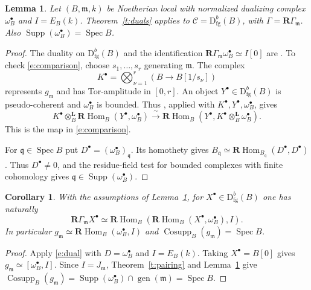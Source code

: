 \documentclass[11pt,reqno]{amsart}
\newtheorem{corollary}[theorem]{Corollary}
\newtheorem{lemma}[theorem]{Lemma}
\theoremstyle{definition}
\DeclareMathOperator{\Cosupp}{Cosupp}
\DeclareMathOperator{\Supp}{Supp}
\DeclareMathOperator{\gen}{gen}
\DeclareMathOperator{\Spec}{Spec}
\newcommand{\D}{\mathrm D}
\newcommand{\q}{\mathfrak q}
\newcommand{\m}{\mathfrak m}
\newcommand{\RHom}{\mathbf R\!\operatorname{Hom}}
\newcommand{\RG}{\mathbf R\Gamma}
\newcommand{\dt}{\otimes^{\mathbf L}}
\newcommand{\fg}{\mathrm{fg}}
\numberwithin{equation}{section}
\begin{document}
\begin{lemma}\label{l:input}
Let $(B,\m,k)$ be Noetherian local with normalized dualizing complex $\omega_B^\bullet$ and $I=E_B(k)$. Theorem~\ref{t:duals} applies to $\mathcal C=\D^b_{\fg}(B)$, with $\Gamma=\RG_{\m}$. Also $\Supp(\omega_B^\bullet)=\Spec B$.
\end{lemma}
\begin{proof}
The duality on $\D^b_{\fg}(B)$ and the identification $\RG_{\m}\omega_B^\bullet\simeq I[0]$ are \cite[Tags 0A7C and 0A82]{stacks}. To check \eqref{e:comparison}, choose $s_1,\ldots,s_r$ generating $\m$. The complex
\[
 K^\bullet=\bigotimes_{\nu=1}^r (B\longrightarrow B[1/s_\nu])
\]
represents $g_{\m}$ and has Tor-amplitude in $[0,r]$. An object $Y^\bullet\in\D^b_{\fg}(B)$ is pseudo-coherent and $\omega_B^\bullet$ is bounded. Thus \cite[Lemma~15.100.3(3)]{stacks}, applied with $K^\bullet,Y^\bullet,\omega_B^\bullet$, gives
\[
 K^\bullet\dt_B\RHom_B(Y^\bullet,\omega_B^\bullet)
 \xrightarrow{\ \sim\ }
 \RHom_B(Y^\bullet,K^\bullet\dt_B\omega_B^\bullet).
\]
This is the map in \eqref{e:comparison}.

For $\q\in\Spec B$ put $D^\bullet=(\omega_B^\bullet)_{\q}$. Its homothety gives $B_{\q}\simeq\RHom_{B_{\q}}(D^\bullet,D^\bullet)$. Thus $D^\bullet\ne0$, and the residue-field test for bounded complexes with finite cohomology gives $\q\in\Supp(\omega_B^\bullet)$.
\end{proof}

\begin{corollary}\label{c:loc}
With the assumptions of Lemma~\ref{l:input}, for $X^\bullet\in\D^b_{\fg}(B)$ one has naturally
\[
 \RG_{\m}X^\bullet\simeq\RHom_B(\RHom_B(X^\bullet,\omega_B^\bullet),I).
\]
In particular $g_{\m}\simeq\RHom_B(\omega_B^\bullet,I)$ and $\Cosupp_B(g_{\m})=\Spec B$.
\end{corollary}
\begin{proof}
Apply \eqref{e:dual} with $D=\omega_B^\bullet$ and $I=E_B(k)$. Taking $X^\bullet=B[0]$ gives $g_{\m}\simeq[\omega_B^\bullet,I]$. Since $I=J_{\m}$, Theorem~\ref{t:pairing} and Lemma~\ref{l:input} give
$\Cosupp_B(g_{\m})=\Supp(\omega_B^\bullet)\cap\gen(\m)=\Spec B$.
\end{proof}
\end{document}
